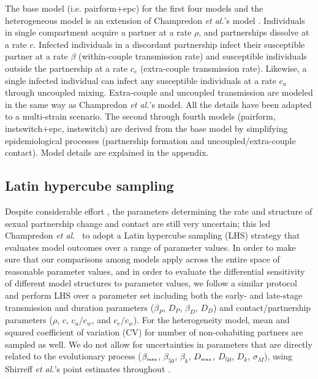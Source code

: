 \documentclass[10pt,letterpaper]{article}
\newcommand{\etal}{\textit{et al.}}
\newcommand{\tsub}[2]{#1_{{\textrm{\tiny #2}}}}
\begin{document}
The base model (i.e. pairform+epc) for the first four models and the heterogeneous model is an extension of Champredon \etal's model \cite{champredon_hiv_2013}. Individuals in single compartment acquire a partner at a rate $\rho$, and partnerships dissolve at a rate $c$. Infected individuals in a discordant partnership infect their susceptible partner at a rate $\beta$ (within-couple transmission rate) and susceptible individuals outside the partnership at a rate $c_e$ (extra-couple transmission rate). Likewise, a single infected individual can infect any susceptible individuals at a rate $c_u$ through uncoupled mixing. Extra-couple and uncoupled transmission are modeled in the same way as Champredon \etal's model. All the details have been adapted to a multi-strain scenario. The second through fourth models (pairform, instswitch+epc, instswitch) are derived from the base model by simplifying epidemiological processes (partnership formation and uncoupled/extra-couple contact). Model details are explained in the appendix.


\subsection*{Latin hypercube sampling}

Despite considerable effort \cite{hollingsworth_hiv1_2008,champredon_hiv_2013}, the parameters determining the rate and structure of sexual partnership change and contact are still very uncertain; this led Champredon \etal\ \cite{champredon_hiv_2013} to adopt a Latin hypercube sampling (LHS) strategy \cite{blower_drugs_1991} that evaluates model outcomes over a range of parameter values. In order to make sure that our comparisons among models apply across the entire space of reasonable parameter values, and in order to evaluate the differential sensitivity of different model structures to parameter values, we follow a similar protocol and perform LHS over a parameter set including both the early- and late-stage transmission and duration parameters ($\beta_P$, $D_P$, $\beta_D$, $D_D$) and contact/partnership parameters ($\rho$, $c$, $c_u/c_w$, and $c_e/c_w$). For the heterogeneity model, mean and squared coefficient of variation (CV) for number of non-cohabiting partners are sampled as well. We do not allow for uncertainties in parameters that are directly related to the evolutionary process ($\tsub{\beta}{max}$, $\beta_{50}$, $\beta_k$, $\tsub{D}{max}$, $D_{50}$, $D_k$, $\sigma_M$), using Shirreff \etal's point estimates throughout \cite{shirreff_transmission_2011}.
\end{document}
